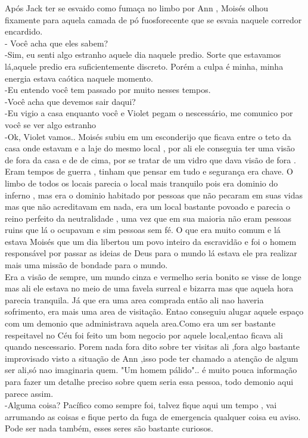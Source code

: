 \documentclass{book}
\begin{document}
  Após Jack ter se esvaido como fumaça no limbo por Ann , Moisés olhou fixamente para aquela camada de pó fuosforecente que se esvaia naquele corredor encardido. \\
  - Você acha que eles sabem?\\
  -Sim, eu senti algo estranho aquele dia naquele predio. Sorte que estavamos lá,aquele predio era suficientemente discreto. Porém a culpa é minha, minha energia estava caótica naquele momento. \\
  -Eu entendo você tem passado por muito nesses tempos. \\
  -Você acha que devemos sair daqui?\\
  -Eu vigio a casa enquanto você e Violet pegam o nescessário, me comunico por você se ver algo estranho\\
  -Ok, Violet vamos..
  Moisés subiu em um esconderijo que ficava entre o teto da casa onde estavam e a laje do mesmo local , por ali ele conseguia ter uma visão de fora da casa e de de cima, por se tratar de um vidro que dava visão de fora . Eram tempos de guerra , tinham que pensar em tudo e segurança era chave. O limbo de todos os locais parecia o local mais tranquilo pois era dominio do inferno , mas era o dominio habitado por pessoas que não pecaram em suas vidas mas que não acreditavam em nada, era um local bastante povoado e parecia o reino perfeito da neutralidade , uma vez que em sua maioria não eram pessoas ruins que lá o ocupavam e sim pessoas sem fé. O que era muito comum e lá estava Moisés que um dia libertou um povo inteiro da escravidão e foi o homem responsável por passar as ideias de Deus para o mundo lá estava ele pra realizar mais uma missão de bondade para o mundo. \\
  Era a visão de sempre, um mundo cinza e vermelho seria bonito se visse de longe mas ali ele estava no meio de uma favela surreal e bizarra mas que aquela hora parecia tranquila. Já que era uma area comprada então ali nao haveria sofrimento, era mais uma area de visitação. Entao conseguiu alugar aquele espaço com um demonio que administrava aquela area.Como era um ser bastante respeitavel no Céu foi feito um bom negocio por aquele local,entao ficava ali quando nescessario. Porem nada fora dito sobre ter visitas ali ,fora algo bastante improvisado visto a situação de Ann ,isso pode ter chamado a atenção de algum ser ali,só nao imaginaria quem.
  "Um homem pálido".. é muito pouca informação para fazer um detalhe preciso sobre quem seria essa pessoa, todo demonio aqui parece assim. \\
  -Alguma coisa? Pacífico como sempre foi, talvez fique aqui um tempo , vai arrumando as coisas e fique perto da fuga de emergencia qualquer coisa eu aviso. Pode ser nada também, esses seres são bastante curiosos. 
\end{document}
